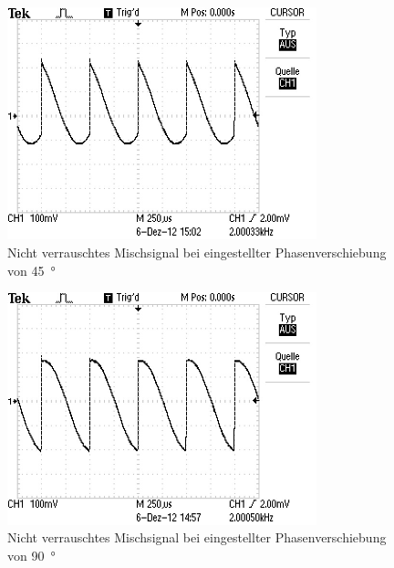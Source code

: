 \begin{figure}
  \centering
  \includegraphics[width=0.8\textwidth]{aufnahmen/phase_45_ohne_rauschen.jpg}
  \caption{Nicht verrauschtes Mischsignal bei eingestellter
    Phasenverschiebung von \SI{45}{\degree}}
  \label{fig:phase_45_nicht_verrauscht}
\end{figure}


\begin{figure}
  \centering
  \includegraphics[width=0.8\textwidth]{aufnahmen/phase_90_ohne_rauschen.jpg}
  \caption{Nicht verrauschtes Mischsignal bei eingestellter
    Phasenverschiebung von \SI{90}{\degree}}
  \label{fig:phase_90_nicht_verrauscht}
\end{figure}


